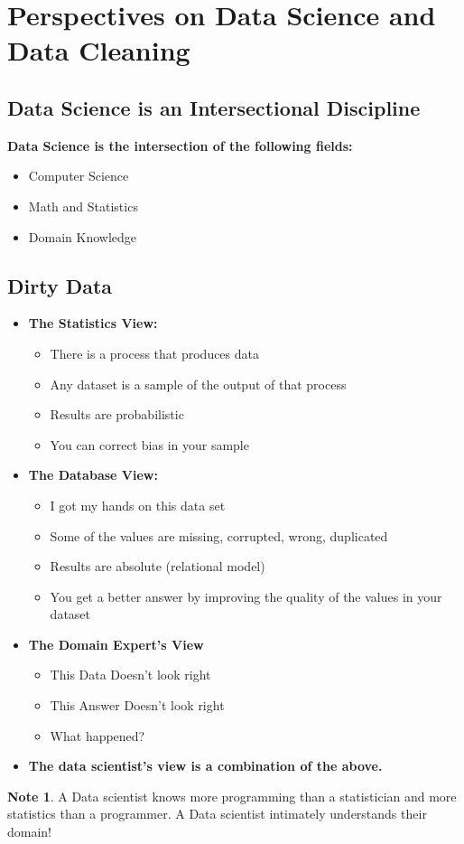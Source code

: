\documentclass[11pt]{article}
\theoremstyle{definition}
\newtheorem{note}{Note}
\begin{document}
\section{Perspectives on Data Science
and Data Cleaning}
\subsection{Data Science is an Intersectional Discipline}
\textbf{Data Science is the intersection of the following fields:}
\begin{itemize}
    \item Computer Science
    \item Math and Statistics
    \item Domain Knowledge
\end{itemize}

\subsection{Dirty Data}
\begin{itemize}
    \item \textbf{The Statistics View:}
    \begin{itemize}
        \item There is a process that produces data
        \item Any dataset is a sample of the output of that process
        \item Results are probabilistic
        \item You can correct bias in your sample
    \end{itemize}
    \item \textbf{The Database View:}
    \begin{itemize}
        \item I got my hands on this data set
        \item Some of the values are missing, corrupted, wrong, duplicated
        \item Results are absolute (relational model)
        \item You get a better answer by improving the quality of the values in your dataset
    \end{itemize}
    \item \textbf{The Domain Expert’s View}
    \begin{itemize}
        \item This Data Doesn’t look right
        \item This Answer Doesn’t look right
        \item What happened?
    \end{itemize}
    \item \textbf{The data scientist's view is a combination of the above.}
\end{itemize}
\begin{note}
    A Data scientist knows more programming than a statistician
    and more statistics than a programmer.
    A Data scientist intimately understands their domain!
\end{note}
\end{document}
